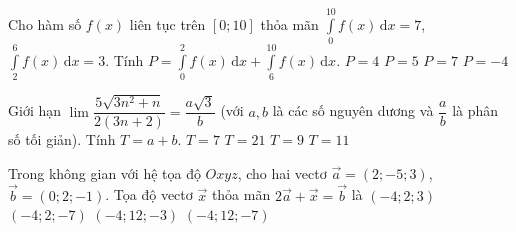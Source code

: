 \begin{ex}%
Cho hàm số $f(x)$ liên tục trên $\left[0;10\right]$ thỏa mãn $\displaystyle\int\limits_0^{10} f(x) \mathrm{\,d}x =7 $, $\displaystyle\int\limits_2^6 f(x) \mathrm{\,d}x =3$. Tính $P=\displaystyle\int\limits_0^2 f(x) \mathrm{\,d}x +\displaystyle\int\limits_6^{10} f(x) \mathrm{\,d}x$.
\choice
{\True $P=4$}
{$P=5$}
{$P=7$}
{$P=-4$}
\end{ex}
\begin{ex}%
Giới hạn $\lim \dfrac{5\sqrt{3n^2+n}}{2\left(3n+2\right)}=\dfrac{a\sqrt{3}}{b}$ (với $a,b$ là các số nguyên dương và $\dfrac{a}{b}$ là phân số tối giản). Tính $T=a+b$.
\choice
{$T=7$}
{$T=21$}
{$T=9$}
{\True $T=11$}
\end{ex}
\begin{ex}%
Trong không gian với hệ tọa độ $Oxyz$, cho hai vectơ $\overrightarrow{a}=\left(2;-5;3\right)$, $\overrightarrow{b}=\left(0;2;-1\right)$. Tọa độ vectơ $\overrightarrow{x}$ thỏa mãn $2\overrightarrow{a}+\overrightarrow{x}=\overrightarrow{b}$ là
\choice
{$\left(-4;2;3\right)$}
{$\left(-4;2;-7\right)$}
{$\left(-4;12;-3\right)$}
{\True $\left(-4;12;-7\right)$}
\end{ex}
